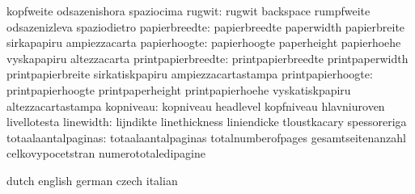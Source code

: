                                   kopfweite                        odsazenishora
                                  spaziocima
                          rugwit: rugwit                           backspace
                                  rumpfweite                       odsazenizleva
                                  spaziodietro                     %
                   papierbreedte: papierbreedte                    paperwidth
                                  papierbreite                     sirkapapiru
                                  ampiezzacarta
                    papierhoogte: papierhoogte                     paperheight
                                  papierhoehe                      vyskapapiru
                                  altezzacarta
              printpapierbreedte: printpapierbreedte               printpaperwidth
                                  printpapierbreite                sirkatiskpapiru
                                  ampiezzacartastampa              %
               printpapierhoogte: printpapierhoogte                printpaperheight
                                  printpapierhoehe                 vyskatiskpapiru
                                  altezzacartastampa               %
                       kopniveau: kopniveau                        headlevel
                                  kopfniveau                       hlavniuroven
                                  livellotesta                     %
                       linewidth: lijndikte                        linethickness
                                  liniendicke                      tloustkacary
                                  spessoreriga
             totaalaantalpaginas: totaalaantalpaginas              totalnumberofpages
                                  gesamtseitenanzahl               celkovypocetstran
                                  numerototaledipagine

\stopcommands




\startcommands                    dutch                            english
                                  german                           czech
                                  italian

